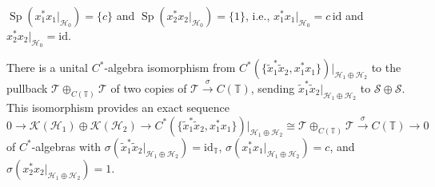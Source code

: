 \begin{corollary}\label{H0spectrum} $\operatorname{Sp}( x_{1}^{\ast}x_{1}%
|_{\mathcal{H}_{0}}) =\{c\} $ and $\operatorname{Sp}
( x_{2}^{\ast}x_{2}|_{\mathcal{H}_{0}}) =\{1\} $,
i.e., $x_{1}^{\ast}x_{1}|_{\mathcal{H}_{0}}=c\, \mathrm{id}$ and $x_{2}^{\ast
}x_{2}|_{\mathcal{H}_{0}}=\mathrm{id}$.
\end{corollary}

\begin{proposition}\label{iso} There is a unital $C^*$-algebra isomorphism from
$C^{\ast}( \{ \tilde{x}_{1}^{\ast}\tilde{x}_{2},x_{1}^{\ast}%
x_{1} \} ) |_{\mathcal{H}_{1}\oplus\mathcal{H}_{2}}$ to the
pullback $\mathcal{T}\oplus_{C(\mathbb{T}) }\mathcal{T}$ of two
copies of $\mathcal{T}\overset{\sigma}{\rightarrow}C(\mathbb{T})
$, sending $\tilde{x}_{1}^{\ast}\tilde{x}_{2}|_{\mathcal{H}_{1}\oplus
\mathcal{H}_{2}}$ to $\mathcal{S}\oplus\mathcal{S}$. This isomorphism provides
an exact sequence%
\[
0\rightarrow\mathcal{K}( \mathcal{H}_{1}) \oplus\mathcal{K}%
( \mathcal{H}_{2}) \rightarrow C^{\ast}(\{ \tilde
{x}_{1}^{\ast}\tilde{x}_{2},x_{1}^{\ast}x_{1}\} ) |_{\mathcal{H}%
_{1}\oplus\mathcal{H}_{2}}\cong\mathcal{T}\oplus_{C(\mathbb{T})
}\mathcal{T}\overset{\sigma}{\rightarrow}C(\mathbb{T})
\rightarrow0
\]
of $C^*$-algebras with $\sigma( \tilde{x}_{1}^{\ast}\tilde{x}%
_{2}|_{\mathcal{H}_{1}\oplus\mathcal{H}_{2}}) =\mathrm{id}_{\mathbb{T}%
}$, $\sigma( x_{1}^{\ast}x_{1}|_{\mathcal{H}_{1}\oplus\mathcal{H}_{2}%
}) =c$, and $\sigma( x_{2}^{\ast}x_{2}|_{\mathcal{H}_{1}%
\oplus\mathcal{H}_{2}}) =1$.
\end{proposition}
